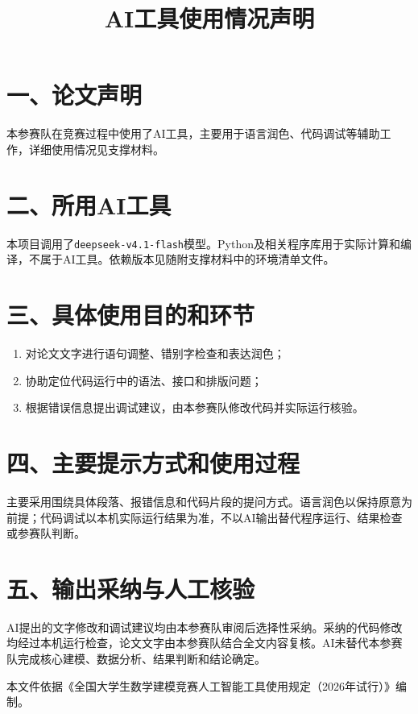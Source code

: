 \documentclass[UTF8,fontset=fandol,a4paper,zihao=-4]{ctexart}
\title{AI工具使用情况声明}
\author{}
\date{}
\begin{document}
\section*{一、论文声明}
本参赛队在竞赛过程中使用了AI工具，主要用于语言润色、代码调试等辅助工作，详细使用情况见支撑材料。

\section*{二、所用AI工具}
本项目调用了\texttt{deepseek-v4.1-flash}模型。Python及相关程序库用于实际计算和编译，不属于AI工具。依赖版本见随附支撑材料中的环境清单文件。

\section*{三、具体使用目的和环节}
\begin{enumerate}
\item 对论文文字进行语句调整、错别字检查和表达润色；
\item 协助定位代码运行中的语法、接口和排版问题；
\item 根据错误信息提出调试建议，由本参赛队修改代码并实际运行核验。
\end{enumerate}

\section*{四、主要提示方式和使用过程}
主要采用围绕具体段落、报错信息和代码片段的提问方式。语言润色以保持原意为前提；代码调试以本机实际运行结果为准，不以AI输出替代程序运行、结果检查或参赛队判断。

\section*{五、输出采纳与人工核验}
AI提出的文字修改和调试建议均由本参赛队审阅后选择性采纳。采纳的代码修改均经过本机运行检查，论文文字由本参赛队结合全文内容复核。AI未替代本参赛队完成核心建模、数据分析、结果判断和结论确定。

本文件依据《全国大学生数学建模竞赛人工智能工具使用规定（2026年试行）》编制。
\end{document}
